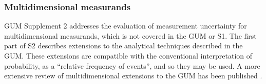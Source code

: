 \subsubsection{Multidimensional measurands}
GUM Supplement 2 addresses the evaluation of measurement uncertainty for multidimensional measurands, which is not covered in the GUM or S1. The first part of S2 describes extensions to the analytical techniques described in the GUM. These extensions are compatible with the conventional interpretation of probability, as a ``relative frequency of events'', and so they may be used. A more extensive review of multidimensional extensions to the GUM has been published \cite{HALL_15}.

